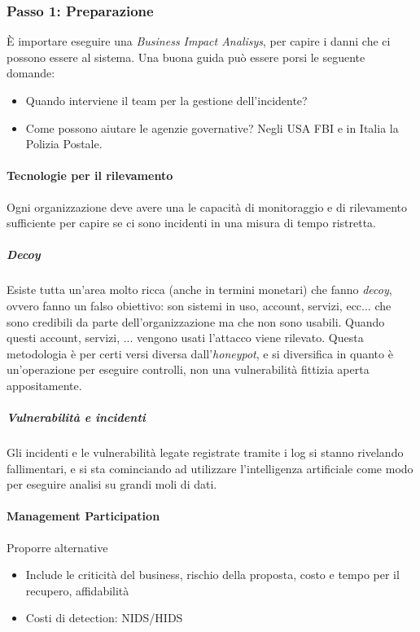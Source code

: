 \subsubsection{Passo 1: Preparazione}

È importare eseguire una \textit{Business Impact Analisys}, per capire i danni
che ci possono essere al sistema.
Una buona guida può essere porsi le seguente domande:
\begin{itemize}
\item Quando interviene il team per la gestione dell'incidente?
\item Come possono aiutare le agenzie governative? Negli USA FBI e in Italia la
Polizia Postale.
\end{itemize}



\paragraph*{Tecnologie per il rilevamento}

Ogni organizzazione deve avere una le capacità di monitoraggio e di rilevamento
sufficiente per capire se ci sono incidenti in una misura di tempo ristretta.

\subparagraph*{Decoy} Esiste tutta un'area molto ricca (anche in termini
monetari) che fanno \textit{decoy}, ovvero fanno un falso obiettivo: son sistemi
in uso, account, servizi, ecc... che sono credibili da parte dell'organizzazione
ma che non sono usabili. Quando questi account, servizi, ... vengono usati
l'attacco viene rilevato. Questa metodologia è per certi versi diversa
dall'\textit{honeypot}, e si diversifica in quanto è un'operazione per eseguire
controlli, non una vulnerabilità fittizia aperta appositamente.

\subparagraph*{Vulnerabilità e incidenti} Gli incidenti e le vulnerabilità
legate registrate tramite i log si stanno rivelando fallimentari, e si sta
cominciando ad utilizzare l'intelligenza artificiale come modo per eseguire
analisi su grandi moli di dati.

\paragraph*{Management Participation}

Proporre alternative
\begin{itemize}
\item Include le criticità del business, rischio della proposta, costo e tempo
per il recupero, affidabilità
\item Costi di detection: NIDS/HIDS
\end{itemize}

